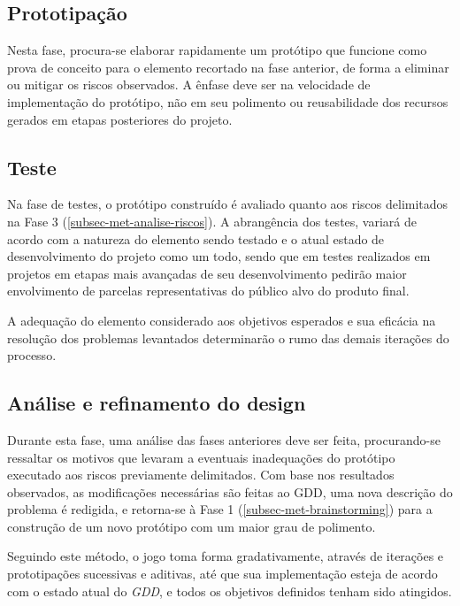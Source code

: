 \subsection{Prototipação}\label{subsec-met-prototipacao}

Nesta fase, procura-se elaborar rapidamente um protótipo que funcione como prova 
de conceito para o elemento recortado na fase anterior, de forma a eliminar ou 
mitigar os riscos observados. A ênfase deve ser na velocidade de implementação 
do protótipo, não em seu polimento ou reusabilidade dos recursos gerados em 
etapas posteriores do projeto.

\subsection{Teste}\label{subsec-met-teste}

Na fase de testes, o protótipo construído é avaliado quanto aos riscos 
delimitados na Fase 3 (\autoref{subsec-met-analise-riscos}). A abrangência dos testes, variará de acordo com a natureza 
do elemento sendo testado e o atual estado de desenvolvimento do projeto como 
um todo, sendo que em testes realizados em projetos em etapas mais avançadas de 
seu desenvolvimento pedirão maior envolvimento de parcelas representativas 
do público alvo do produto final.

A adequação do elemento considerado aos objetivos esperados e sua eficácia 
na resolução dos problemas levantados determinarão o rumo das demais iterações 
do processo.

\subsection{Análise e refinamento do design}\label{subsec-met-analise-refinamento}

Durante esta fase, uma análise das fases anteriores deve ser feita, 
procurando-se ressaltar os motivos que levaram a eventuais inadequações do 
protótipo executado aos riscos previamente delimitados. Com base nos 
resultados observados, as modificações necessárias são feitas ao GDD, uma 
nova descrição do problema é redigida, e retorna-se à Fase 1 (\autoref{subsec-met-brainstorming}) para a construção 
de um novo protótipo com um maior grau de polimento.

Seguindo este método, o jogo toma forma gradativamente, através de iterações 
e prototipações sucessivas e aditivas, até que sua implementação esteja de 
acordo com o estado atual do \textit{GDD}, e todos os objetivos definidos tenham 
sido atingidos.
